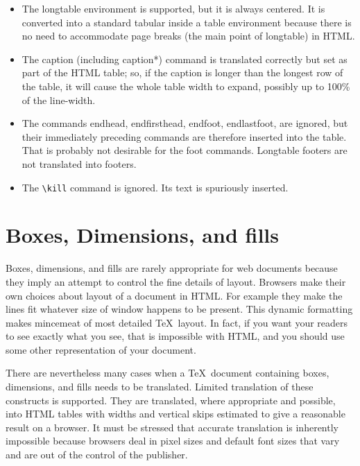 \documentclass[12pt]{article}
\begin{document}
\begin{itemize}

\item
The longtable environment is supported, but it is always centered. It
is converted into a standard tabular inside a table environment
because there is no need to accommodate page breaks (the main point of
longtable) in HTML. 

\item The caption (including caption*) command is
translated correctly but set as part of the HTML table; so, if the
caption is longer than the longest row of the table, it will cause the
whole table width to expand, possibly up to 100\% of the
line-width. 

\item The commands endhead, endfirsthead, endfoot, endlastfoot,
are ignored, but their immediately preceding commands are therefore
inserted into the table. That is probably not desirable for the foot
commands.  Longtable footers are not translated into footers. 

\item The \verb!\kill!  command is ignored. Its text is spuriously inserted.
\end{itemize}



\section{Boxes, Dimensions, and fills}

Boxes, dimensions, and fills are rarely appropriate for web documents
because they imply an attempt to control the fine details of
layout. Browsers make their own choices about layout of a document in
HTML. For example they make the lines fit whatever size of window
happens to be present. This dynamic formatting makes mincemeat of most
detailed \TeX\ layout. In fact, if you want your readers to see
exactly what you see, that is impossible with HTML, and you should use
some other representation of your document.

There are nevertheless many cases when a \TeX\ document containing
boxes, dimensions, and fills needs to be translated.  Limited
translation of these constructs is supported. They are translated,
where appropriate and possible, into HTML tables with widths and
vertical skips estimated to give a reasonable result on a browser. It
must be stressed that accurate translation is inherently impossible
because browsers deal in pixel sizes and default font sizes that vary
and are out of the control of the publisher.
\end{document}

